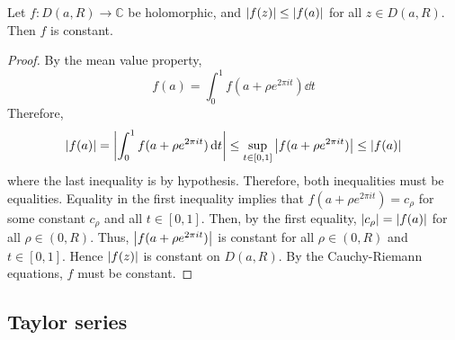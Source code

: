 \begin{theorem}
	Let \( f \colon D(a,R) \to \mathbb C \) be holomorphic, and \( \abs{f(z)} \leq \abs{f(a)} \) for all \( z \in D(a,R) \).
	Then \( f \) is constant.
\end{theorem}
\begin{proof}
	By the mean value property,
	\[ f(a) = \int_0^1 f(a+\rho e^{2 \pi i t}) \dd{t} \]
	Therefore,
	\[ \abs{f(a)} = \abs{\int_0^1 f(a + \rho e^{2 \pi i t}) \dd{t}} \leq \sup_{t \in [0,1]} \abs{f(a+\rho e^{2 \pi i t})} \leq \abs{f(a)} \]
	where the last inequality is by hypothesis.
	Therefore, both inequalities must be equalities.
	Equality in the first inequality implies that \( f(a+\rho e^{2 \pi i t}) = c_\rho \) for some constant \( c_\rho \) and all \( t \in [0,1] \).
	Then, by the first equality, \( \abs{c_\rho} = \abs{f(a)} \) for all \( \rho \in (0,R) \).
	Thus, \( \abs{f(a+\rho e^{2 \pi i t})} \) is constant for all \( \rho \in (0,R) \) and \( t \in [0,1] \).
	Hence \( \abs{f(z)} \) is constant on \( D(a,R) \).
	By the Cauchy-Riemann equations, \( f \) must be constant.
\end{proof}

\subsection{Taylor series}
\begin{theorem}

\end{theorem}
